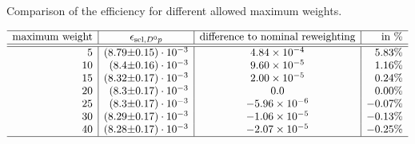  
\begin{table}[hptb]
    \centering
    \caption{Comparison of the efficiency \effSelDp for different allowed maximum weights.}
    \label{tab:systematic_effD0p_maxweight}
    $\begin{array}{r|r@{\pm}l|c|r}
    \hline
    \text{maximum weight}  & \multicolumn{2}{c|}{\effSelDp}  & \text{difference to nominal reweighting} & \text{in \%} \\ \hline \hline
5 & (8.79 & 0.15) \cdot 10^{-3} & \num[round-mode=figures, round-precision=3]{0.000483640507719} & 5.83\%\\ 10 & (8.4 & 0.16) \cdot 10^{-3} & \num[round-mode=figures, round-precision=3]{9.60100390259e-05} & 1.16\%\\ 15 & (8.32 & 0.17) \cdot 10^{-3} & \num[round-mode=figures, round-precision=3]{2.00375500349e-05} & 0.24\%\\ 20 & (8.3 & 0.17) \cdot 10^{-3} & \num[round-mode=figures, round-precision=3]{0.0} & 0.00\%\\ 25 & (8.3 & 0.17) \cdot 10^{-3} & \num[round-mode=figures, round-precision=3]{-5.95559256641e-06} & -0.07\%\\ 30 & (8.29 & 0.17) \cdot 10^{-3} & \num[round-mode=figures, round-precision=3]{-1.05520925512e-05} & -0.13\%\\ 40 & (8.28 & 0.17) \cdot 10^{-3} & \num[round-mode=figures, round-precision=3]{-2.06929754863e-05} & -0.25\%\\ 
    \hline
    \end{array}$
\end{table}
